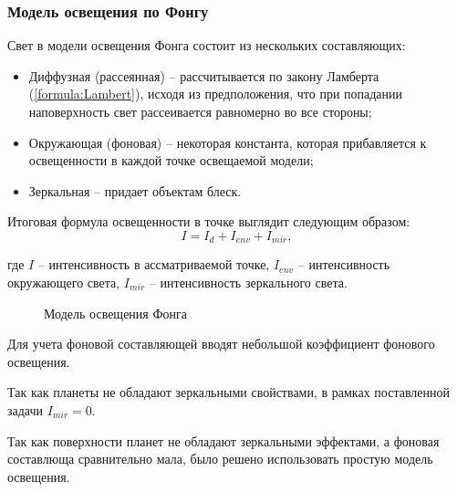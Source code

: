 	\subsubsection*{Модель освещения по Фонгу}
	\par Свет в модели освещения Фонга состоит из нескольких составляющих:
	\begin{itemize}
		\item Диффузная (рассеянная) -- рассчитывается по закону Ламберта (\ref{formula:Lambert}), исходя из предположения, что при попадании наповерхность свет рассеивается равномерно во все стороны;
		\item Окружающая (фоновая) -- некоторая константа, которая прибавляется к освещенности в каждой точке освещаемой модели;
		\item Зеркальная -- придает объектам блеск.
	\end{itemize}
	\par Итоговая формула освещенности в точке выглядит следующим образом:
	\begin{equation}\label{formula:Fong}
		I = I_{d} + I_{env} + I_{mir},
	\end{equation}
	\par где \begin{math}I\end{math} -- интенсивность в ассматриваемой точке, \begin{math}I_{env}\end{math} -- интенсивность окружающего света, \begin{math}I_{mir}\end{math} -- интенсивность зеркального света.
	\begin{figure}[h!]
		\caption{Модель освещения Фонга}
		\label{ris:image_f}
	\end{figure}
	\par Для учета фоновой составляющей вводят небольшой коэффициент фонового освещения.
	\par Так как планеты не обладают зеркальными свойствами, в рамках поставленной задачи \begin{math}I_{mir} = 0\end{math}.
	\par Так как поверхности планет не обладают зеркальными эффектами, а фоновая составлюща сравнительно мала, было решено использовать простую модель освещения.

